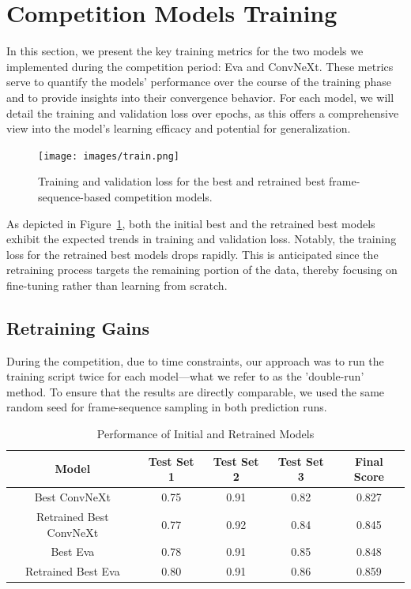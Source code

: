 \documentclass[a4paper,12pt,openright]{book}
\begin{document}
\section{Competition Models Training}
In this section, we present the key training metrics for the two models we implemented during the competition period: Eva and ConvNeXt. These metrics serve to quantify the models' performance over the course of the training phase and to provide insights into their convergence behavior. For each model, we will detail the training and validation loss over epochs, as this offers a comprehensive view into the model's learning efficacy and potential for generalization.

\begin{figure}[!htb]
\centering
\texttt{[image: images/train.png]}
\caption{Training and validation loss for the best and retrained best frame-sequence-based competition models.}
\label{fig:training_validation_loss}
\end{figure}

As depicted in Figure~\ref{fig:training_validation_loss}, both the initial best and the retrained best models exhibit the expected trends in training and validation loss. Notably, the training loss for the retrained best models drops rapidly. This is anticipated since the retraining process targets the remaining portion of the data, thereby focusing on fine-tuning rather than learning from scratch.

\subsection{Retraining Gains}
During the competition, due to time constraints, our approach was to run the training script twice for each model—what we refer to as the 'double-run' method. To ensure that the results are directly comparable, we used the same random seed for frame-sequence sampling in both prediction runs.
\begin{table}[!htb]
\centering


\begin{tabular}{|c|c|c|c|c|}
\hline
Model & Test Set 1 & Test Set 2 & Test Set 3 & Final Score \\
\hline
Best ConvNeXt & 0.75 & 0.91 & 0.82 & 0.827 \\
\hline
Retrained Best ConvNeXt & 0.77 & 0.92 & 0.84 & 0.845 \\
\hline
Best Eva & 0.78 & 0.91 & 0.85 & 0.848 \\
\hline
Retrained Best Eva & 0.80 & 0.91 & 0.86 & 0.859 \\
\hline
\end{tabular}
\caption{Performance of Initial and Retrained Models}
\label{tab:retraining_gains}

\end{table}
\end{document}
